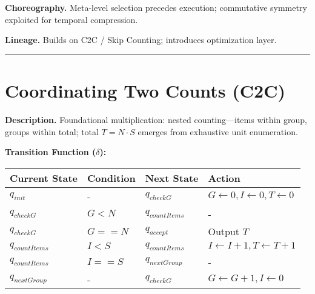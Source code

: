 \documentclass[
]{article}
\begin{document}
\textbf{Choreography.} Meta-level selection precedes execution;
commutative symmetry exploited for temporal compression.

\textbf{Lineage.} Builds on C2C / Skip Counting; introduces optimization
layer.

\begin{center}\rule{0.5\linewidth}{0.5pt}\end{center}

\section{Coordinating Two Counts
(C2C)}\label{coordinating-two-counts-c2c}

\textbf{Description.} Foundational multiplication: nested
counting---items within group, groups within total; total
\(T = N \cdot S\) emerges from exhaustive unit enumeration.

\textbf{Transition Function (\(\delta\)):}

\begin{longtable}[]{@{}
  >{\raggedright\arraybackslash}p{}
  >{\raggedright\arraybackslash}p{}
  >{\raggedright\arraybackslash}p{}
  >{\raggedright\arraybackslash}p{}@{}}
\toprule\noalign{}
\begin{minipage}[b]{\linewidth}\raggedright
Current State
\end{minipage} & \begin{minipage}[b]{\linewidth}\raggedright
Condition
\end{minipage} & \begin{minipage}[b]{\linewidth}\raggedright
Next State
\end{minipage} & \begin{minipage}[b]{\linewidth}\raggedright
Action
\end{minipage} \\
\midrule\noalign{}
\endhead
\bottomrule\noalign{}
\endlastfoot
\(q_{init}\) & - & \(q_{checkG}\) &
\(G \leftarrow 0, I \leftarrow 0, T \leftarrow 0\) \\
\(q_{checkG}\) & \(G < N\) & \(q_{countItems}\) & - \\
\(q_{checkG}\) & \(G == N\) & \(q_{accept}\) & Output \(T\) \\
\(q_{countItems}\) & \(I < S\) & \(q_{countItems}\) &
\(I \leftarrow I+1, T \leftarrow T+1\) \\
\(q_{countItems}\) & \(I == S\) & \(q_{nextGroup}\) & - \\
\(q_{nextGroup}\) & - & \(q_{checkG}\) &
\(G \leftarrow G+1, I \leftarrow 0\) \\
\end{longtable}
\end{document}
